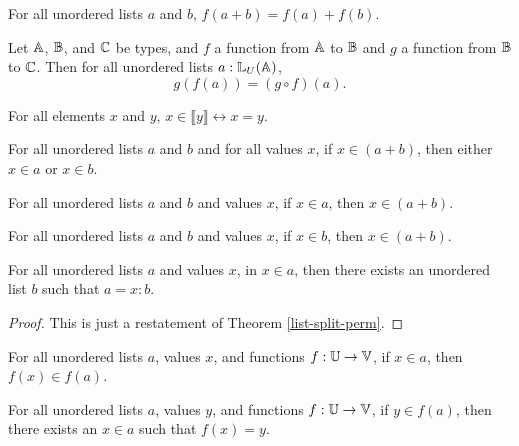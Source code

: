 \documentclass[../math.tex]{subfiles}
\begin{document}
\begin{theorem}
    For all unordered lists $a$ and $b$, $f(a + b) = f(a) + f(b)$.
\end{theorem}

\begin{theorem}
    Let $\mathbb{A}$, $\mathbb{B}$, and $\mathbb{C}$ be types, and $f$ a function from $\mathbb{A}$ to $\mathbb{B}$ and
    $g$ a function from $\mathbb{B}$ to $\mathbb{C}$.  Then for all unordered lists $a :
    \mathbb{L}_U(\mathbb{A})$,
    \[
        g(f(a)) = (g \circ f)(a).
    \]
\end{theorem}

\begin{theorem}
    For all elements $x$ and $y$, $x \in \llbracket y\rrbracket \leftrightarrow
    x = y$.
\end{theorem}

\begin{theorem} \label{in-ulist-conc}
    For all unordered lists $a$ and $b$ and for all values $x$, if $x \in (a +
    b)$, then either $x \in a$ or $x \in b$.
\end{theorem}

\begin{theorem} \label{in-ulist-lconc}
    For all unordered lists $a$ and $b$ and values $x$, if $x \in a$, then $x
    \in (a + b)$.
\end{theorem}

\begin{theorem} \label{in-ulist-rconc}
    For all unordered lists $a$ and $b$ and values $x$, if $x \in b$, then $x
    \in (a + b)$.
\end{theorem}

\begin{theorem} \label{in-ulist-split}
    For all unordered lists $a$ and values $x$, in $x \in a$, then there exists
    an unordered list $b$ such that $a = x : b$.
\end{theorem}
\begin{proof}
    This is just a restatement of Theorem \ref{list-split-perm}.
\end{proof}

\begin{theorem} \label{in-ulist-image}
    For all unordered lists $a$, values $x$, and functions $f : \mathbb{U} \to \mathbb{V}$, if
    $x \in a$, then $f(x) \in f(a)$.
\end{theorem}

\begin{theorem} \label{image-in-ulist}
    For all unordered lists $a$, values $y$, and functions $f : \mathbb{U} \to \mathbb{V}$, if
    $y \in f(a)$, then there exists an $x \in a$ such that $f(x) = y$.
\end{theorem}
\end{document}
